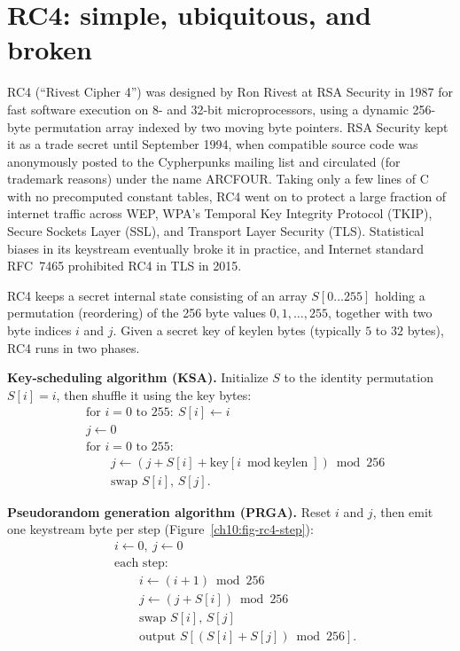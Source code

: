 \section{RC4: simple, ubiquitous, and broken}
\label{ch10:rc4}

\begin{historybox}
RC4 (``Rivest Cipher 4'') was designed by Ron Rivest at RSA Security in 1987 for fast software execution on 8- and 32-bit microprocessors, using a dynamic 256-byte permutation array indexed by two moving byte pointers. RSA Security kept it as a trade secret until September 1994, when compatible source code was anonymously posted to the Cypherpunks mailing list and circulated (for trademark reasons) under the name ARCFOUR. Taking only a few lines of C with no precomputed constant tables, RC4 went on to protect a large fraction of internet traffic across WEP, WPA's Temporal Key Integrity Protocol (TKIP), Secure Sockets Layer (SSL), and Transport Layer Security (TLS). Statistical biases in its keystream eventually broke it in practice, and Internet standard RFC~7465 prohibited RC4 in TLS in 2015.
\end{historybox}

RC4 keeps a secret internal state consisting of an array $S[0\dots 255]$ holding a permutation (reordering) of the 256 byte values $0, 1, \dots, 255$, together with two byte indices $i$ and $j$. Given a secret key of $\text{keylen}$ bytes (typically $5$ to $32$ bytes), RC4 runs in two phases.

\textbf{Key-scheduling algorithm (KSA).} Initialize $S$ to the identity permutation $S[i] = i$, then shuffle it using the key bytes:
\begin{align*}
  &\text{for } i = 0 \text{ to } 255:\ S[i] \gets i \\
  &j \gets 0 \\
  &\text{for } i = 0 \text{ to } 255:\\
  &\qquad j \gets (j + S[i] + \text{key}[i \bmod \text{keylen}]) \bmod 256 \\
  &\qquad \text{swap } S[i],\, S[j].
\end{align*}

\textbf{Pseudorandom generation algorithm (PRGA).} Reset $i$ and $j$, then emit one keystream byte per step (Figure~\ref{ch10:fig-rc4-step}):
\begin{align*}
  &i \gets 0,\ j \gets 0 \\
  &\text{each step:}\\
  &\qquad i \gets (i+1) \bmod 256 \\
  &\qquad j \gets (j + S[i]) \bmod 256 \\
  &\qquad \text{swap } S[i],\, S[j] \\
  &\qquad \text{output } S[(S[i] + S[j]) \bmod 256].
\end{align*}

